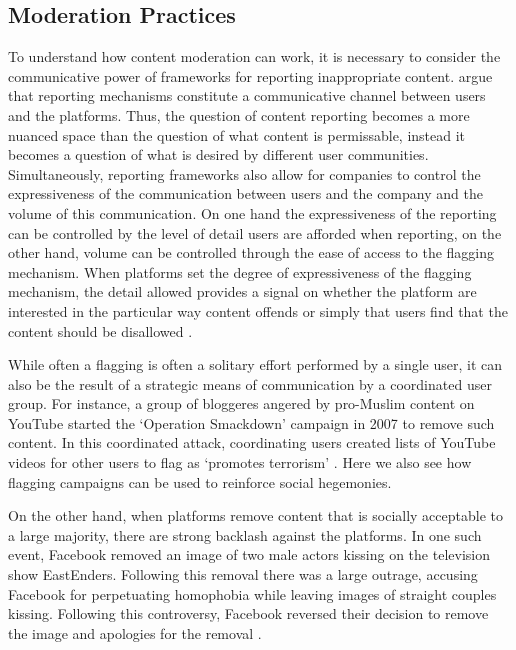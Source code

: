 \subsection{Moderation Practices}
To understand how content moderation can work, it is necessary to consider the communicative power of frameworks for reporting inappropriate content. \citet{Crawford:2016} argue that reporting mechanisms constitute a communicative channel between users and the platforms. Thus, the question of content reporting becomes a more nuanced space than the question of what content is permissable, instead it becomes a question of what is desired by different user communities\cite{Crawford:2016}. Simultaneously, reporting frameworks also allow for companies to control the expressiveness of the communication between users and the company and the volume of this communication\cite{Crawford:2016}. On one hand the expressiveness of the reporting can be controlled by the level of detail users are afforded when reporting, on the other hand, volume can be controlled through the ease of access to the flagging mechanism. When platforms set the degree of expressiveness of the flagging mechanism, the detail allowed provides a signal on whether the platform are interested in the particular way content offends or simply that users find that the content should be disallowed \citep{Crawford:2016}.

While often a flagging is often a solitary effort performed by a single user, it can also be the result of a strategic means of communication by a coordinated user group. For instance, a group of bloggeres angered by pro-Muslim content on YouTube started the `Operation Smackdown' campaign in 2007 to remove such content. In this coordinated attack, coordinating users created lists of YouTube videos for other users to flag as `promotes terrorism' \citep{Crawford:2016}. Here we also see how flagging campaigns can be used to reinforce social hegemonies.

On the other hand, when platforms remove content that is socially acceptable to a large majority, there are strong backlash against the platforms. In one such event, Facebook removed an image of two male actors kissing on the television show EastEnders. Following this removal there was a large outrage, accusing Facebook for perpetuating homophobia while leaving images of straight couples kissing. Following this controversy, Facebook reversed their decision to remove the image and apologies for the removal \citep{Crawford:2016}.\vspace{5mm}

